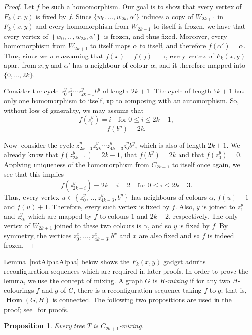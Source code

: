 \documentclass[11 pt]{amsart}
\newtheorem{prop}[equation]{Proposition}
\theoremstyle{definition}
\theoremstyle{case}
\numberwithin{equation}{section}
\newcommand{\bHom}{\operatorname{\mathbf{Hom}}}
\begin{document}
\begin{proof}
Let $f$ be such a homomorphism. Our goal is to show that every vertex of $F_k(x,y)$ is fixed by $f$. Since $\{w_0,\dots,w_{2k},\alpha'\}$ induces a copy of $W_{2k+1}$ in $F_k(x,y)$ and every homomorphism from $W_{2k+1}$ to itself is frozen, we have that every vertex of $\left\{w_0,\dots,w_{2k},\alpha'\right\}$ is frozen, and thus fixed. Moreover, every homomorphism from $W_{2k+1}$ to itself maps $\alpha$ to itself, and therefore $f(\alpha')=\alpha$. Thus, since we are assuming that $f(x)=f(y)=\alpha$, every vertex of $F_k(x,y)$ apart from $x,y$ and $\alpha'$ has a neighbour of colour $\alpha$, and it therefore mapped into $\{0,\dots,2k\}$. 

Consider the cycle $z_0^yz_1^y\cdots z_{2k-1}^y b^y$ of length $2k+1$. The cycle of length $2k+1$ has only one homomorphism to itself, up to composing with an automorphism. So, without loss of generality, we may assume that 
\[f\left(z_i^y\right)=i\quad \text{for } 0\leq i\leq 2k-1,\]
\[f\left(b^y\right)=2k.\]

Now, consider the cycle $z_{2k-1}^y z_{2k}^y\cdots z_{4k-3}^yz_0^y b^y$, which is also of length $2k+1$. We already know that $f(z_{2k-1}^y)=2k-1$, that $f(b^y)=2k$ and that $f(z_0^y)=0$. Applying uniqueness of the homomorphism from $C_{2k+1}$ to itself once again, we see that this implies 
\[f\left(z_{2k+i}^y\right)=2k-i-2\quad \text{for }0\leq i\leq 2k-3.\]
Thus, every vertex $u\in \left\{z_0^y,\dots,z_{4k-3}^y,b^y\right\}$ has neighbours of colours $\alpha$, $f(u)-1$ and $f(u)+1$. Therefore, every such vertex is fixed by $f$. Also, $y$ is joined to $z_1^y$ and $z_{2k}^y$ which are mapped by $f$ to colours $1$ and $2k-2$, respectively. The only vertex of $W_{2k+1}$ joined to these two colours is $\alpha$, and so $y$ is fixed by $f$. By symmetry, the vertices $z_0^x,\dots,z_{4k-3}^x,b^x$ and $x$ are also fixed and so $f$ is indeed frozen. 
\end{proof}

Lemma~\ref{notAlphaAlpha} below shows the $F_k(x,y)$ gadget admits reconfiguration sequences which are required in later proofs.  In order to prove the lemma, we use the concept of mixing.  A graph $G$ is \emph{$H$-mixing} if for any two $H$-colourings $f$ and $g$ of $G$, there is a reconfiguration sequence taking $f$ to $g$; that is, $\bHom(G,H)$ is connected.  The following two propositions are used in the proof; see~\cite[Propositions~3.12 and~7.12]{BrewsterNoel} for proofs. 

\begin{prop}
\label{treeMix}
Every tree $T$ is $C_{2k+1}$-mixing.
\end{prop}
\end{document}
